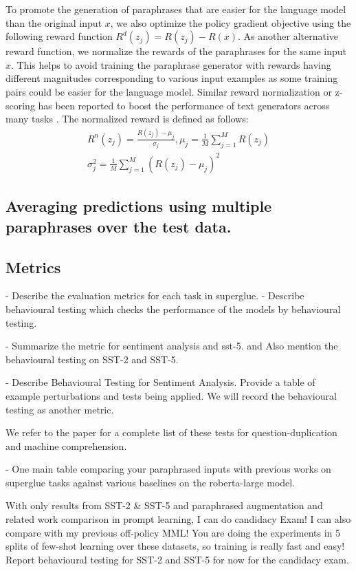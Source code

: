 \documentclass[11pt]{article}
\begin{document}
To promote the generation of paraphrases that are easier for the language model than the original input $x$, we also optimize the policy gradient objective using the following reward function $R^{d}(z_{j}) = R(z_{j}) - R(x)$. As another alternative reward function, we normalize the rewards of the paraphrases for the same input $x$. This helps to avoid training the paraphrase generator with rewards having different magnitudes corresponding to various input examples as some training pairs could be easier for the language model. Similar reward normalization or z-scoring has been reported to boost the performance of text generators across many tasks \cite{guo-etal-2022-efficient}. The normalized reward is defined as follows:
\begin{multline}
R^{n}(z_{j}) = \frac{R(z_{j}) - \mu_{j}}{\sigma_{j}}, \mu_{j} = \frac{1}{M} \sum^{M}_{j=1} R(z_{j}) \\
\sigma^{2}_{j} = \frac{1}{M} \sum^{M}_{j=1} (R(z_{j}) - \mu_{j})^2
\label{normal-reward}
\end{multline}

\subsection{Averaging predictions using multiple paraphrases over the test data.}

\subsection{Metrics}
- Describe the evaluation metrics for each task in superglue.
- Describe behavioural testing which checks the performance of the models by behavioural testing.

- Summarize the metric for sentiment analysis and sst-5. and Also mention the behavioural testing on SST-2 and SST-5.

- Describe Behavioural Testing for Sentiment Analysis. Provide a table of example perturbations and tests being applied. We will record the behavioural testing as another metric.

We refer to the paper for a complete list of these tests for question-duplication and machine comprehension.


- One main table comparing your paraphrased inputs with previous works on superglue tasks against various baselines on the roberta-large model.

    With only results from SST-2 & SST-5 and paraphrased augmentation and related work comparison in prompt learning, I can do candidacy Exam! I can also compare with my previous off-policy MML! You are doing the experiments in 5 splits of few-shot learning over these datasets, so training is really fast and easy!
    Report behavioural testing for SST-2 and SST-5 for now for the candidacy exam.
\end{document}
